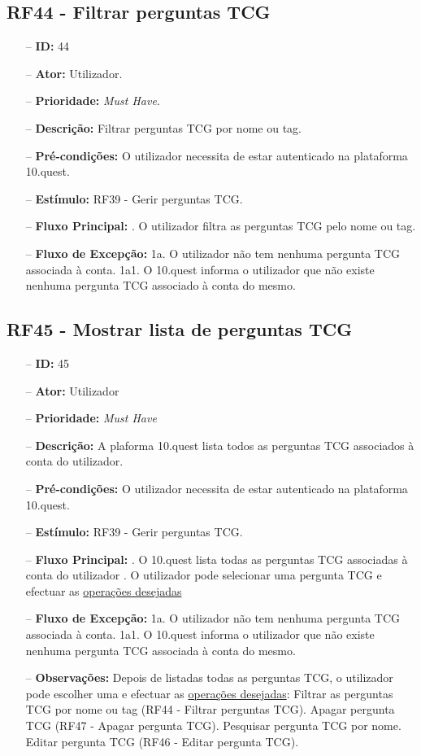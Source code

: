 \subsection{RF44 - Filtrar perguntas TCG}
\begin{itemize}
	\item[--] \textbf{ID:} 44
	\item[--]  \textbf{Ator:} Utilizador.
	\item[--]  \textbf{Prioridade:} \textit{Must Have}.
	\item[--]  \textbf{Descrição:} Filtrar perguntas TCG por nome ou tag.
	\item[--]  \textbf{Pré-condições:} O utilizador necessita de estar autenticado na plataforma 10.quest.
	\item[--]  \textbf{Estímulo:} RF39 - Gerir perguntas TCG.
	\item[--]  \textbf{Fluxo Principal:} 
	. O utilizador filtra as perguntas TCG pelo nome ou tag.
	\item[--]  \textbf{Fluxo de Excepção:} 
	\subitem 1a. O utilizador não tem nenhuma pergunta TCG associada à conta.
	\subitem 1a1. O 10.quest informa o utilizador que não existe nenhuma pergunta TCG  associado à conta do mesmo.
\end{itemize}
\newpage

\subsection{RF45 - Mostrar lista de perguntas TCG}
\begin{itemize}
	\item[--] \textbf{ID:} 45
	\item[--]  \textbf{Ator:} Utilizador
	\item[--]  \textbf{Prioridade:} \textit{Must Have}
	\item[--]  \textbf{Descrição:} A plaforma 10.quest lista todos as perguntas TCG  associados à conta do utilizador.
	\item[--]  \textbf{Pré-condições:} O utilizador necessita de estar autenticado na plataforma 10.quest.
	\item[--]  \textbf{Estímulo:} RF39 - Gerir perguntas TCG.
	\item[--]  \textbf{Fluxo Principal:} 
	. O 10.quest lista todas as perguntas TCG associadas à conta do utilizador
	. O utilizador pode selecionar uma pergunta TCG e efectuar as \underline{operações desejadas}
	\item[--]  \textbf{Fluxo de Excepção:} 
	\subitem 1a. O utilizador não tem nenhuma pergunta TCG associada à conta.
	\subitem 1a1. O 10.quest informa o utilizador que não existe nenhuma pergunta TCG associada à conta do mesmo.
	\item[--]  \textbf{Observações:} Depois de listadas todas as perguntas TCG, o utilizador pode escolher uma e efectuar as \underline{operações desejadas}:
	\subitem Filtrar as perguntas TCG por nome ou tag (RF44 - Filtrar perguntas TCG).
	\subitem Apagar pergunta TCG (RF47 - Apagar pergunta TCG).
	\subitem Pesquisar pergunta TCG por nome.
	\subitem Editar pergunta TCG (RF46 - Editar pergunta TCG).
\end{itemize}
\newpage


